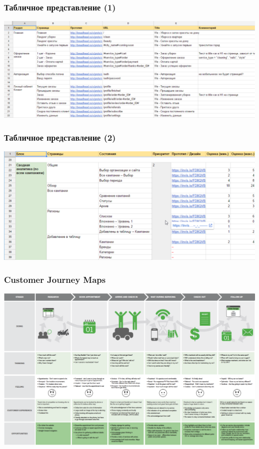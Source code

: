 \documentclass{../../slides-style}
\begin{document}
    \begin{frame}
        \frametitle{Табличное представление (1)}
        \begin{center}
            \includegraphics[width=\textwidth]{tableView1.png}
        \end{center}
    \end{frame}

    \begin{frame}
        \frametitle{Табличное представление (2)}
        \begin{center}
            \includegraphics[width=\textwidth]{tableView2.png}
        \end{center}
    \end{frame}

    \begin{frame}
        \frametitle{Customer Journey Maps}
        \begin{center}
            \includegraphics[width=\textwidth]{customerJourneyMaps.png}
        \end{center}
    \end{frame}
\end{document}
